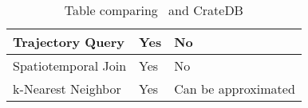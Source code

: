 \begin{table}[h]
\begin{tabular}{|P{3.3cm}|P{6cm}|P{4cm}|}
    \hline
    Trajectory Query                  & Yes                                                                 & No                                                     \\
    \hline
    Spatiotemporal Join               & Yes                                                                 & No                                                \\
    \hline
    k-Nearest Neighbor                & Yes                                                                 & Can be approximated   \\
    \hline
  \end{tabular}
  \caption{Table comparing \mobilitydbc~and CrateDB}
  \label{tab:mobilitydb_vs_cratedb}
\end{table}




